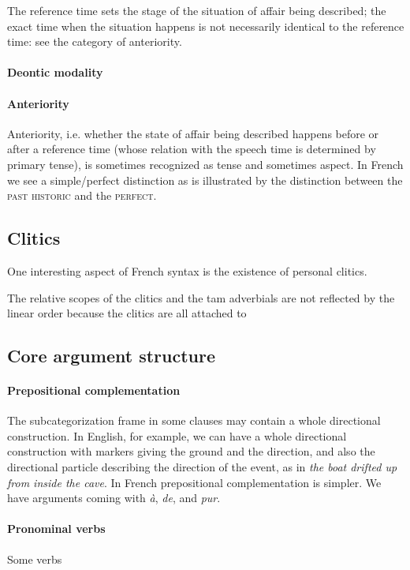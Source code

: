 \documentclass[a4paper, oneside, 12pt]{report}
\newcommand{\form}[1]{\emph{#1}}
\newcommand*{\category}[1]{\textsc{#1}}
\begin{document}
The reference time sets the stage of the situation of affair being described;
the exact time when the situation happens is not necessarily identical to the reference time:
see the category of anteriority. 

\paragraph*{Deontic modality}

\paragraph*{Anteriority}
Anteriority, i.e. whether the state of affair being described
happens before or after a reference time 
(whose relation with the speech time is determined by primary tense),
is sometimes recognized as tense and sometimes aspect.
In French we see a simple/perfect distinction as is illustrated
by the distinction between the \category{past historic} and the \category{perfect}.

\subsection{Clitics}\label{sec:grammatical.clause.clitic}

One interesting aspect of French syntax is the existence of personal clitics.

The relative scopes of the clitics and the \ac{tam} adverbials are not reflected by the linear order because the clitics are all attached to 

\subsection{Core argument structure}

\paragraph*{Prepositional complementation} 
The subcategorization frame in some clauses may contain a whole directional construction.
In English, for example, we can have a whole directional construction
with markers giving the ground and the direction,
and also the directional particle describing the direction of the event,
as in \form{the boat drifted up from inside the cave}.
In French prepositional complementation is simpler.
We have arguments coming with \form{à}, \form{de}, and \form{pur}.

\paragraph*{Pronominal verbs}
Some verbs 
\end{document}
